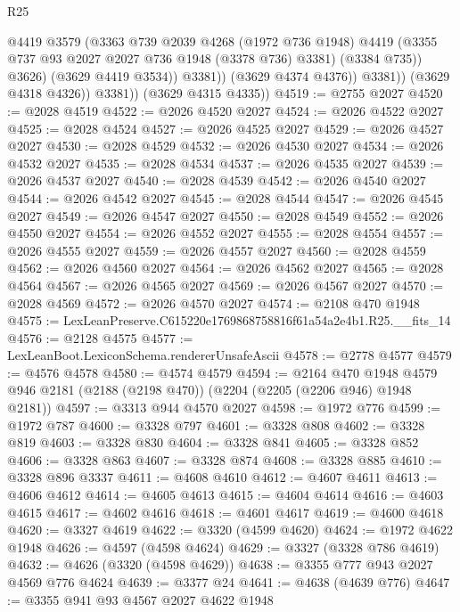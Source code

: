 \begin{lexlean}{R25}
\begin{coremodule}
                          @4419
                          @3579
                          (@3363
                            @739
                            @2039
                            @4268
                            (@1972 @736 @1948)
                            @4419
                            (@3355 @737 @93 @2027 @2027 @736 @1948 (@3378 @736) @3381)
                            (@3384 @735))
                          @3626)
                        (@3629 @4419 @3534))
                      @3381))
                  (@3629 @4374 @4376))
                @3381))
            (@3629 @4318 @4326))
          @3381))
      (@3629 @4315 @4335))
@4519 := @2755 @2027
@4520 := @2028 @4519
@4522 := @2026 @4520 @2027
@4524 := @2026 @4522 @2027
@4525 := @2028 @4524
@4527 := @2026 @4525 @2027
@4529 := @2026 @4527 @2027
@4530 := @2028 @4529
@4532 := @2026 @4530 @2027
@4534 := @2026 @4532 @2027
@4535 := @2028 @4534
@4537 := @2026 @4535 @2027
@4539 := @2026 @4537 @2027
@4540 := @2028 @4539
@4542 := @2026 @4540 @2027
@4544 := @2026 @4542 @2027
@4545 := @2028 @4544
@4547 := @2026 @4545 @2027
@4549 := @2026 @4547 @2027
@4550 := @2028 @4549
@4552 := @2026 @4550 @2027
@4554 := @2026 @4552 @2027
@4555 := @2028 @4554
@4557 := @2026 @4555 @2027
@4559 := @2026 @4557 @2027
@4560 := @2028 @4559
@4562 := @2026 @4560 @2027
@4564 := @2026 @4562 @2027
@4565 := @2028 @4564
@4567 := @2026 @4565 @2027
@4569 := @2026 @4567 @2027
@4570 := @2028 @4569
@4572 := @2026 @4570 @2027
@4574 := @2108 @470 @1948
@4575 := LexLeanPreserve.C615220e1769868758816f61a54a2e4b1.R25.__fits_14
@4576 := @2128 @4575
@4577 := LexLeanBoot.LexiconSchema.rendererUnsafeAscii
@4578 := @2778 @4577
@4579 := @4576 @4578
@4580 := @4574 @4579
@4594 := @2164
    @470
    @1948
    @4579
    @946
    @2181
    (@2188 (@2198 @470))
    (@2204 (@2205 (@2206 @946) @1948 @2181))
@4597 := @3313 @944 @4570 @2027
@4598 := @1972 @776
@4599 := @1972 @787
@4600 := @3328 @797
@4601 := @3328 @808
@4602 := @3328 @819
@4603 := @3328 @830
@4604 := @3328 @841
@4605 := @3328 @852
@4606 := @3328 @863
@4607 := @3328 @874
@4608 := @3328 @885
@4610 := @3328 @896 @3337
@4611 := @4608 @4610
@4612 := @4607 @4611
@4613 := @4606 @4612
@4614 := @4605 @4613
@4615 := @4604 @4614
@4616 := @4603 @4615
@4617 := @4602 @4616
@4618 := @4601 @4617
@4619 := @4600 @4618
@4620 := @3327 @4619
@4622 := @3320 (@4599 @4620)
@4624 := @1972 @4622 @1948
@4626 := @4597 (@4598 @4624)
@4629 := @3327 (@3328 @786 @4619)
@4632 := @4626 (@3320 (@4598 @4629))
@4638 := @3355 @777 @943 @2027 @4569 @776 @4624
@4639 := @3377 @24
@4641 := @4638 (@4639 @776)
@4647 := @3355 @941 @93 @4567 @2027 @4622 @1948

\end{coremodule}
\end{lexlean}
